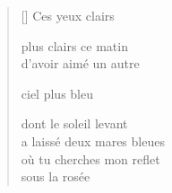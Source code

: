 \documentclass[12pt,a4paper]{article}
\begin{document}

\newpage

\poemtitle{}

\settowidth{\versewidth}{où tu cherches mon reflet}

\bigskip

\begin{verse}[\versewidth]
  Ces yeux clairs

  plus clairs ce matin \\
  d'avoir aimé un autre

  ciel plus bleu

  dont le soleil levant \\
  a laissé deux mares bleues \\
  où tu cherches mon reflet \\
  sous la rosée
\end{verse}


\newpage

\poemtitle{}

\settowidth{\versewidth}{to the necklaces of their laughter}

\bigskip
\end{document}
